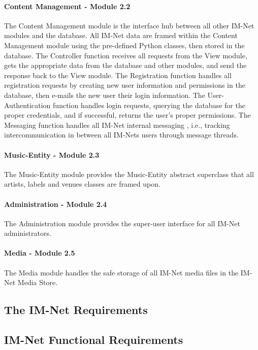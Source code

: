 \documentclass[letterpaper,12pt]{article}
\begin{document}
{\paragraph{Content Management - Module 2.2}
The Content Management module is the interface hub between all other IM-Net modules and the database. All IM-Net data are framed within the Content Management module using the pre-defined Python classes, then stored in the database. The Controller function receives all requests from the View module, gets the appropriate data from the database and other modules, and send the response back to the View module. The Registration function handles all registration requests by creating new user information and permissions in the database, then e-mails the new user their login information. The User-Authentication function handles login requests, querying the database for the proper credentials, and if successful, returns the user's proper permissions. The Messaging function handles all IM-Net internal messaging , i.e., tracking intercommunication in between all IM-Nets users through message threads.

\paragraph{Music-Entity - Module 2.3}
The Music-Entity module provides the Music-Entity abstract superclass that all artists, labels and venues classes are framed upon.

\paragraph{Administration - Module 2.4}
The Administration module provides the super-user interface for all IM-Net administrators.

\paragraph{Media - Module 2.5}
The Media module handles the safe storage of all IM-Net media files in the IM-Net Media Store.


\eject

\textcolor{section}{\section{The IM-Net Requirements}}
 
\textcolor{subsection}{\subsection{IM-Net Functional Requirements}}

}
\end{document}
